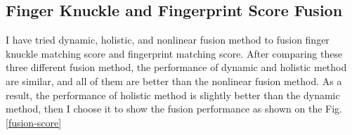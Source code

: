 \subsection{Finger Knuckle and Fingerprint Score Fusion}
I have tried dynamic, holistic, and nonlinear fusion method to fusion finger knuckle matching score and fingerprint matching score. After comparing these three different fusion method, the performance of dynamic and holistic method are similar, and all of them are better than the nonlinear fusion method. As a result, the performance of holistic method is slightly better than the dynamic method, then I choose it to show the fusion performance as shown on the Fig. \ref{fusion-score}

\begin{figure}[ht!]
    \centering


\end{figure}

